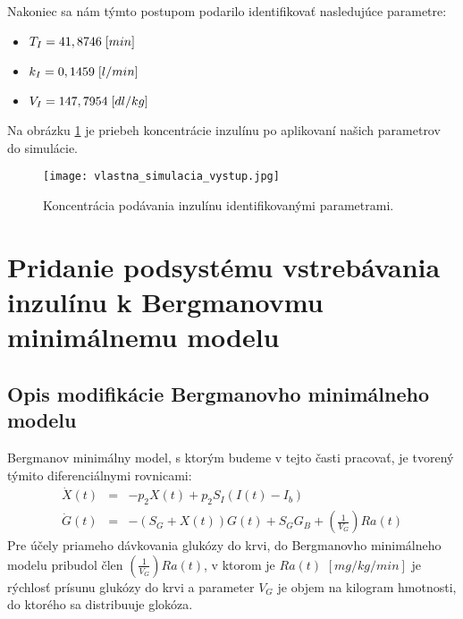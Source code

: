 \documentclass[11pt]{article} %
\begin{document}
Nakoniec sa nám týmto postupom podarilo identifikovať nasledujúce parametre:
\begin{itemize}
\item $T_I = 41,8746 \hspace{1mm}[min]$ 
\item $k_I = 0,1459 \hspace{1mm}[l/min]$ 
\item $V_I = 147,7954 \hspace{1mm}[dl/kg]$ 
\end{itemize}

Na obrázku \ref{fig:vlastna_simulacia_vystup} je priebeh koncentrácie inzulínu po aplikovaní našich parametrov do simulácie.
 
\begin{figure}[h]
	\centering
	\texttt{[image: vlastna\_simulacia\_vystup.jpg]} 
	\caption{Koncentrácia podávania inzulínu identifikovanými parametrami.}
	\label{fig:vlastna_simulacia_vystup}
\end{figure}


\vspace{10mm}

\section{Pridanie podsystému vstrebávania inzulínu k Bergmanovmu minimálnemu modelu}

\subsection{Opis modifikácie Bergmanovho minimálneho modelu}

Bergmanov minimálny model, s ktorým budeme v tejto časti pracovať, je tvorený týmito diferenciálnymi rovnicami:
\begin{eqnarray}
	\dot{X}(t) &=& -p_2X(t) + p_2 S_I (I(t)-I_b) \label{eq:bmm1} \\ 
	\dot{G}(t) &=& -(S_G + X(t))G(t) + S_G G_B + \left(\frac{1}{V_G}\right)Ra(t) \label{eq:bmm2} 
\end{eqnarray}
Pre účely priameho dávkovania glukózy do krvi, do Bergmanovho minimálneho modelu pribudol člen $\left(\frac{1}{V_G}\right)Ra(t)$, v ktorom je $Ra(t)$ $[mg/kg/min]$ je rýchlosť prísunu glukózy do krvi a parameter ${V_G}$ je objem na kilogram hmotnosti, do ktorého sa distribuuje glokóza. 
\end{document}
